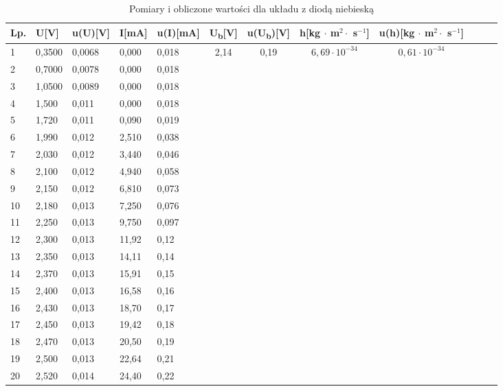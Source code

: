 \documentclass[12pt]{article}
\begin{document}
\begin{table}[]
    \caption*{Pomiary i obliczone wartości dla układu z diodą niebieską}
        \begin{tabular}{|l|l|l|l|l|c|c|c|c|c|c|c|} \hline
        Lp. & U[V] & u(U)[V] & I[mA] & u(I)[mA] & U\textsubscript{b}[V] & u(U\textsubscript{b})[V] & h[kg $\cdot$ m$^2 \cdot$ s$^{-1}$] & u(h)[kg $\cdot$ m$^2 \cdot$ s$^{-1}$] \\ \hline
        1 & 0,3500 & 0,0068 & 0,000 & 0,018 & \multirow{20}{*}{2,14} & \multirow{20}{*}{0,19} & \multirow{20}{*}{$6,69 \cdot 10^{-34}$} & \multirow{20}{*}{$0,61 \cdot 10^{-34}$} \\ \cline{1-5}
        2 & 0,7000 & 0,0078 & 0,000 & 0,018 &  &  &  &  \\ \cline{1-5}
        3 & 1,0500 & 0,0089 & 0,000 & 0,018 &  &  &  &  \\ \cline{1-5}
        4 & 1,500 & 0,011 & 0,000 & 0,018 &  &  &  &  \\ \cline{1-5}
        5 & 1,720 & 0,011 & 0,090 & 0,019 &  &  &  &  \\ \cline{1-5}
        6 & 1,990 & 0,012 & 2,510 & 0,038 &  &  &  &  \\ \cline{1-5}
        7 & 2,030 & 0,012 & 3,440 & 0,046 &  &  &  &  \\ \cline{1-5}
        8 & 2,100 & 0,012 & 4,940 & 0,058 &  &  &  &  \\ \cline{1-5}
        9 & 2,150 & 0,012 & 6,810 & 0,073  &  &  &  &  \\ \cline{1-5}
        10 & 2,180 & 0,013 & 7,250 & 0,076 &  &  &  &  \\ \cline{1-5}
        11 & 2,250 & 0,013 & 9,750 & 0,097 &  &  &  &  \\ \cline{1-5}
        12 & 2,300 & 0,013 & 11,92 & 0,12 &  &  &  &  \\ \cline{1-5}
        13 & 2,350 & 0,013 & 14,11 & 0,14 &  &  &  &  \\ \cline{1-5}
        14 & 2,370 & 0,013 & 15,91 & 0,15 &  &  &  &  \\ \cline{1-5}
        15 & 2,400 & 0,013 & 16,58 & 0,16 &  &  &  &  \\ \cline{1-5}
        16 & 2,430 & 0,013 & 18,70 & 0,17 &  &  &  &  \\ \cline{1-5}
        17 & 2,450 & 0,013 & 19,42 & 0,18 &  &  &  &  \\ \cline{1-5}
        18 & 2,470 & 0,013 & 20,50 & 0,19 &  &  &  &  \\ \cline{1-5}
        19 & 2,500 & 0,013 & 22,64 & 0,21 &  &  &  &  \\ \cline{1-5}
        20 & 2,520 & 0,014 & 24,40 & 0,22 &  &  &  &  \\ \hline
        \end{tabular}
\end{table}
\end{document}
